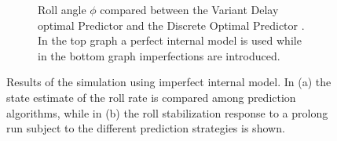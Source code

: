 \begin{figure}
\begin{subfigure}[b]{\textwidth}
        \caption{Roll angle \ensuremath{\phi} compared between  the Variant Delay optimal Predictor and the Discrete Optimal Predictor . In the top graph a perfect internal model is used while in the bottom graph imperfections are introduced.}            
        \label{fig:predictor_compare2}
    \end{subfigure}
    \caption{Results of the simulation using imperfect internal model. In (a) the state estimate of the roll rate is compared among prediction algorithms, while in (b) the roll stabilization response to a prolong run subject to  the different prediction strategies is shown.}
    \label{fig:predictor_compareA}
 \end{figure}


     \begin{figure}
        \centering
        \begin{subfigure}[b]{\textwidth}
            \centering
            \caption{}
            \label{fig:gains_speed1}
        \end{subfigure}
        \begin{subfigure}[b]{\textwidth}
            \centering
            \caption{}            
            \label{fig:gains_speed2}

\end{subfigure}
\end{figure}
